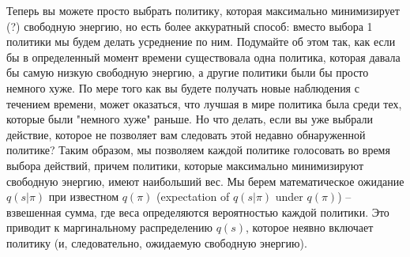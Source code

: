 \documentclass[12pt]{article}
\begin{document}
Теперь вы можете просто выбрать политику, которая максимально минимизирует (?) свободную энергию, но есть более аккуратный способ: вместо выбора 1 политики мы будем делать усреднение по ним. Подумайте об этом так, как если бы в определенный момент времени существовала одна политика, которая давала бы самую низкую свободную энергию, а другие политики были бы просто немного хуже. По мере того как вы будете получать новые наблюдения с течением времени, может оказаться, что лучшая в мире политика была среди тех, которые были "немного хуже" раньше. Но что делать, если вы уже выбрали действие, которое не позволяет вам следовать этой недавно обнаруженной политике? Таким образом, мы позволяем каждой политике голосовать во время выбора действий, причем политики, которые максимально минимизируют свободную энергию, имеют наибольший вес. Мы берем математическое ожидание $q(s|\pi)$ при известном $q(\pi)$ (expectation of $q(s|\pi)$ under $q(\pi)$) -- взвешенная сумма, где веса определяются вероятностью каждой политики. Это приводит к маргинальному распределению $q(s)$, которое неявно включает политику (и, следовательно, ожидаемую свободную энергию).

\begin{figure}[h]
\end{figure}

\end{document}
